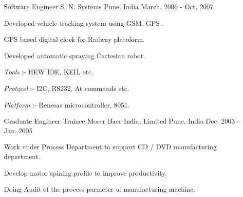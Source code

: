 \begin{cventries}
  \cventry
    {Software Engineer} %
    {S. N. Systems} %
    {Pune, India} %
    {March. 2006 - Oct. 2007} %
    {
      \begin{cvitems} %
        \item {Developed vehicle tracking system using GSM, GPS .}
        \item {GPS based digital clock for Railway platoform.}
        \item {Developed automatic spraying Cartesian robot.}
        \item {\textit{Tools} :- HEW IDE, KEIL etc.}
        \item {\textit{Protocol} :- I2C, RS232, At commands etc.}
        \item {\textit{Platform} :- Renesas microcontroller, 8051.}
      \end{cvitems}
    }
\cventry
    {Graduate Engineer Trainee} %
    {Moser Baer India, Limited } %
    {Pune, India} %
    {Dec. 2003 - Jan. 2005} %
    {
      \begin{cvitems} %
        \item {Work under Process Department to support CD / DVD manufacturing department.}
		\item {Develop motor spining profile to improve productivity.}
		\item {Doing Audit of the process parmeter of manufacturing machine.}
      \end{cvitems}
    }    
\end{cventries}
